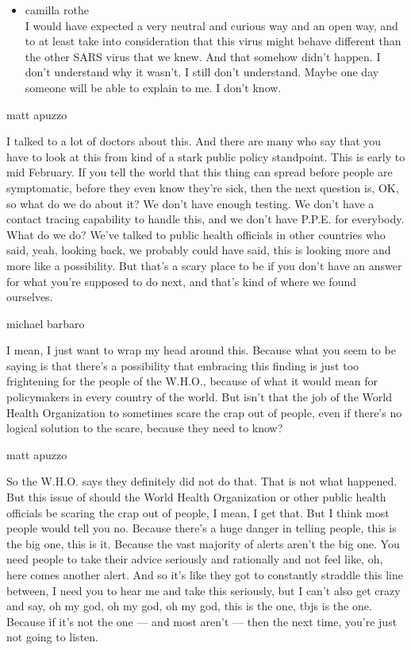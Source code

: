 \begin{itemize}
\tightlist
\item
  camilla rothe\\
  I would have expected a very neutral and curious way and an open way,
  and to at least take into consideration that this virus might behave
  different than the other SARS virus that we knew. And that somehow
  didn't happen. I don't understand why it wasn't. I still don't
  understand. Maybe one day someone will be able to explain to me. I
  don't know.
\end{itemize}

matt apuzzo

I talked to a lot of doctors about this. And there are many who say that
you have to look at this from kind of a stark public policy standpoint.
This is early to mid February. If you tell the world that this thing can
spread before people are symptomatic, before they even know they're
sick, then the next question is, OK, so what do we do about it? We don't
have enough testing. We don't have a contact tracing capability to
handle this, and we don't have P.P.E. for everybody. What do we do?
We've talked to public health officials in other countries who said,
yeah, looking back, we probably could have said, this is looking more
and more like a possibility. But that's a scary place to be if you don't
have an answer for what you're supposed to do next, and that's kind of
where we found ourselves.

michael barbaro

I mean, I just want to wrap my head around this. Because what you seem
to be saying is that there's a possibility that embracing this finding
is just too frightening for the people of the W.H.O., because of what it
would mean for policymakers in every country of the world. But isn't
that the job of the World Health Organization to sometimes scare the
crap out of people, even if there's no logical solution to the scare,
because they need to know?

matt apuzzo

So the W.H.O. says they definitely did not do that. That is not what
happened. But this issue of should the World Health Organization or
other public health officials be scaring the crap out of people, I mean,
I get that. But I think most people would tell you no. Because there's a
huge danger in telling people, this is the big one, this is it. Because
the vast majority of alerts aren't the big one. You need people to take
their advice seriously and rationally and not feel like, oh, here comes
another alert. And so it's like they got to constantly straddle this
line between, I need you to hear me and take this seriously, but I can't
also get crazy and say, oh my god, oh my god, oh my god, this is the
one, tbjs is the one. Because if it's not the one --- and most aren't
--- then the next time, you're just not going to listen.

